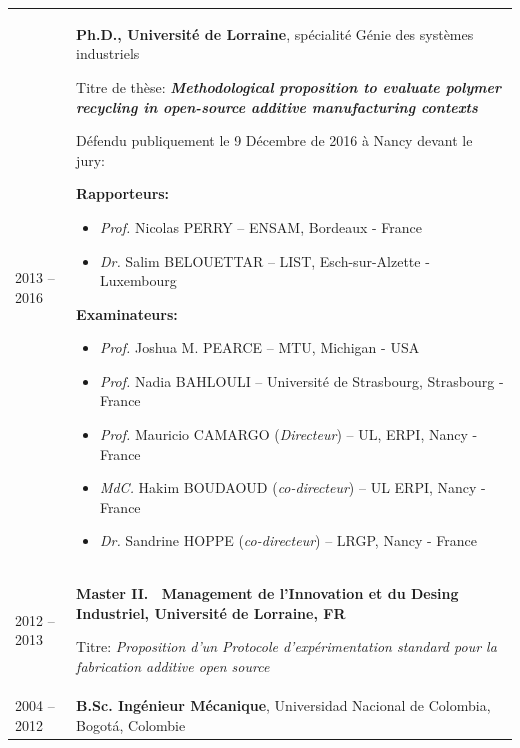 \documentclass[
  11pt,
]{article}
\begin{document}
\begin{tabu} to \linewidth {X[0.3,l] X[2,l]}

2013 -- 2016 & \textbf{Ph.D., Université de Lorraine}, spécialité Génie des systèmes industriels \par
    Titre de thèse: \textbf{\emph{Methodological proposition to evaluate polymer recycling in open-source additive manufacturing contexts}} \par\vspace{5pt}
    
Défendu publiquement le 9 Décembre de 2016 à Nancy devant le jury:\par\vspace{5pt}

    \textbf{Rapporteurs:}
    \begin{itemize}
    
        \item \textit{Prof.} Nicolas PERRY --  ENSAM, Bordeaux - France
        \item \textit{Dr.} Salim BELOUETTAR -- LIST, Esch-sur-Alzette - Luxembourg
    \end{itemize}

\vspace{5pt}
    \textbf{Examinateurs:}
    \begin{itemize}
    
        \item \textit{Prof.} Joshua M. PEARCE -- MTU, Michigan - USA
        \item \textit{Prof.} Nadia BAHLOULI -- Université de Strasbourg, Strasbourg - France
        \item \textit{Prof.} Mauricio CAMARGO (\textit{Directeur}) -- UL, ERPI, Nancy - France
        
        \item \textit{MdC.} Hakim BOUDAOUD (\textit{co-directeur}) -- UL ERPI, Nancy - France
        
        \item \textit{Dr.} Sandrine HOPPE (\textit{co-directeur})  --  LRGP, Nancy - France
    \end{itemize}
        \\ [5pt]

2012 -- 2013 &
    \textbf{Master II.~ Management de l'Innovation et du Desing Industriel, Université de Lorraine, FR} \par Titre: \emph{Proposition d'un Protocole d'expérimentation standard pour la fabrication additive open source} \\[5pt]

2004 -- 2012 &
    \textbf{B.Sc. Ingénieur Mécanique}, Universidad Nacional de Colombia, Bogotá, Colombie \\
    
\end{tabu}
\end{document}
